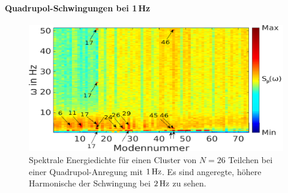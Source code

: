 \documentclass[numbers=noenddot,a4paper,notitlepage,twoside,BCOR15mm]{scrbook}
\begin{document}
					\paragraph{Quadrupol-Schwingungen bei 1\,Hz}

							\begin{figure}[!b]
								\centering
								\includegraphics[width=\textwidth]{figs/auswertung/manipulation/quadrupol1Hzpowerdens.png}
								\caption{Spektrale Energiedichte für einen Cluster von $N=26$ Teilchen bei einer Quadrupol-Anregung mit $\unit[1]{Hz}$. Es sind angeregte, höhere Harmonische der Schwingung bei $\unit[2]{Hz}$ zu sehen.}\label{img:powerdensquadrupol1Hz}
							\end{figure}
\end{document}
